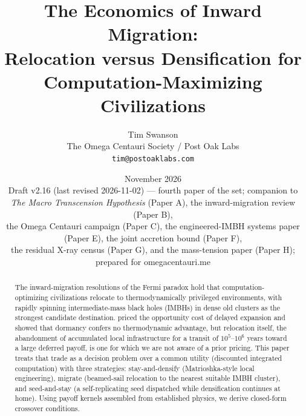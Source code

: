 \documentclass[11pt]{article}
\title{\textbf{The Economics of Inward Migration:\\ Relocation versus Densification for Computation-Maximizing Civilizations}}
\author{Tim Swanson\\[2pt]
\small The Omega Centauri Society / Post Oak Labs\\
\small \texttt{tim@postoaklabs.com}}
\date{November 2026 \\[4pt] \small Draft v2.16 (last revised 2026-11-02) --- fourth paper of the set; companion to \emph{The Macro Transcension Hypothesis} (Paper A), the inward-migration review (Paper B),\\ \small the Omega Centauri campaign (Paper C), the engineered-IMBH systems paper (Paper E), the joint accretion bound (Paper F),\\ \small the residual X-ray census (Paper G), and the mass-tension paper (Paper H);\\ \small prepared for omegacentauri.me}
\begin{document}
\maketitle

\begin{abstract}
\noindent
The inward-migration resolutions of the Fermi paradox hold that computation-optimizing civilizations relocate to thermodynamically privileged environments, with rapidly spinning intermediate-mass black holes (IMBHs) in dense old clusters as the strongest candidate destination. \citet{Bostrom2003} priced the opportunity cost of delayed expansion and \citet{Bennett2019} showed that dormancy confers no thermodynamic advantage, but relocation itself, the abandonment of accumulated local infrastructure for a transit of $10^{5}$--$10^{6}$ years toward a large deferred payoff, is one for which we are not aware of a prior pricing. This paper treats that trade as a decision problem over a common utility (discounted integrated computation) with three strategies: stay-and-densify (Matrioshka-style local engineering), migrate (beamed-sail relocation to the nearest suitable IMBH cluster), and seed-and-stay (a self-replicating seed dispatched while densification continues at home). Using payoff kernels assembled from established physics, we derive closed-form crossover conditions.


\end{abstract}
\end{document}
